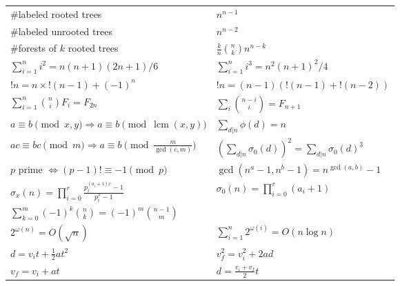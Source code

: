 \documentclass[15pt,a4paper]{article}
\DeclareMathOperator{\lcm}{lcm}
\DeclareRobustCommand{\stirling}{\genfrac\{\}{0pt}{}}
\begin{document}
\begin{landscape}
\begin{multicols*}{3}
    \vspace{10pt}
    \begin{tabular}{ll}
        \#labeled rooted trees & $n^{n-1}$ \\
        \#labeled unrooted trees & $n^{n-2}$ \\
        \#forests of $k$ rooted trees & $\frac{k}{n}\binom{n}{k}n^{n-k}$ \\
        $\sum_{i=1}^n i^2 = n(n+1)(2n+1)/6$ & $\sum_{i=1}^n i^3 = n^2(n+1)^2/4$ \\
        $!n = n\times!(n-1)+(-1)^n$ & $!n = (n-1)(!(n-1)+!(n-2))$ \\
        $\sum_{i=1}^n \binom{n}{i} F_i = F_{2n}$ & $\sum_{i} \binom{n-i}{i} = F_{n+1}$ \\
        $a \equiv b \pmod{x,y} \Rightarrow a \equiv b \pmod{\lcm(x, y)}$ & $\sum_{d|n} \phi(d) = n$ \\
        $ac\equiv bc\pmod{m} \Rightarrow a\equiv b\pmod{\frac{m}{\gcd(c,m)}}$ & $(\sum_{d|n} \sigma_0(d))^2 = \sum_{d|n} \sigma_0(d)^3$ \\
        $p$ prime $\Leftrightarrow (p-1)!\equiv -1\pmod{p}$ & $\gcd(n^a-1,n^b-1) = n^{\gcd(a,b)}-1$ \\
        $\sigma_x(n) = \prod_{i=0}^{r} \frac{p_i^{(a_i + 1)x} - 1}{p_i^x - 1}$ & $\sigma_0(n) = \prod_{i=0}^r (a_i + 1)$ \\
        $\sum_{k=0}^m (-1)^k \binom{n}{k} = (-1)^m \binom{n-1}{m}$ & \\
        $2^{\omega(n)} = O(\sqrt{n})$ & $\sum_{i=1}^n 2^{\omega(i)} = O(n \log n)$ \\
        $d = v_i t + \frac{1}{2}at^2$ & $v_f^2 = v_i^2 + 2ad$ \\
        $v_f = v_i + at$ & $d = \frac{v_i + v_f}{2}t$ \\
    \end{tabular}


\end{multicols*}
\end{landscape}
\end{document}
